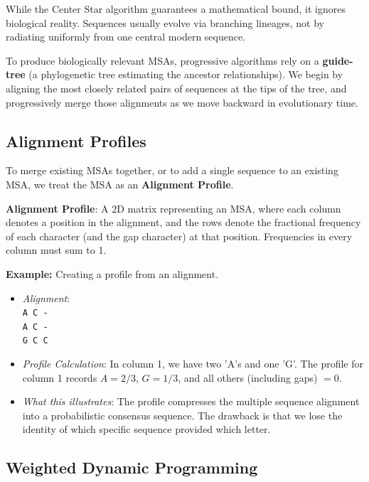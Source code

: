 While the Center Star algorithm guarantees a mathematical bound, it ignores biological reality. Sequences usually evolve via branching lineages, not by radiating uniformly from one central modern sequence.

To produce biologically relevant MSAs, progressive algorithms rely on a \textbf{guide-tree} (a phylogenetic tree estimating the ancestor relationships). We begin by aligning the most closely related pairs of sequences at the tips of the tree, and progressively merge those alignments as we move backward in evolutionary time.

\subsection{Alignment Profiles}

To merge existing MSAs together, or to add a single sequence to an existing MSA, we treat the MSA as an \textbf{Alignment Profile}.

\begin{important}
    \textbf{Alignment Profile}: A 2D matrix representing an MSA, where each column denotes a position in the alignment, and the rows denote the fractional frequency of each character (and the gap character) at that position. Frequencies in every column must sum to 1.
\end{important}

\textbf{Example:} Creating a profile from an alignment.
\begin{itemize}
    \item \textit{Alignment}: \\
    \texttt{A C -} \\
    \texttt{A C -} \\
    \texttt{G C C}
    \item \textit{Profile Calculation}: In column 1, we have two 'A's and one 'G'. The profile for column 1 records $A=2/3$, $G=1/3$, and all others (including gaps) $=0$. 
    \item \textit{What this illustrates}: The profile compresses the multiple sequence alignment into a probabilistic consensus sequence. The drawback is that we lose the identity of which specific sequence provided which letter.
\end{itemize}

\subsection{Weighted Dynamic Programming}

